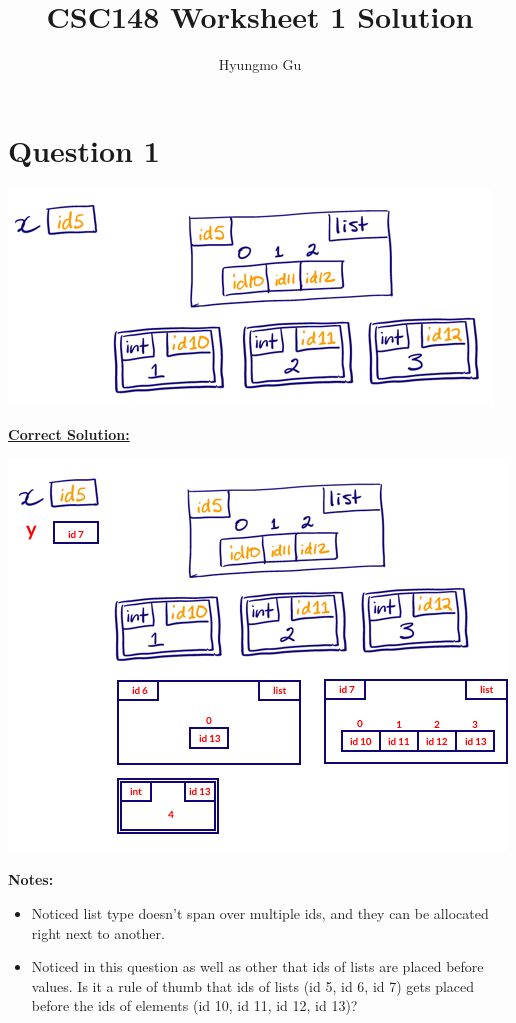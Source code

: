 \documentclass[12pt]{article}
\begin{document}
\title{CSC148 Worksheet 1 Solution}
\author{Hyungmo Gu}
\maketitle

\section*{Question 1}
\begin{center}
\includegraphics[width=0.5\linewidth]{images/worksheet_1_q1_solution.png}
\end{center}

\bigskip

\begin{mdframed}
    \underline{\textbf{Correct Solution:}}

    \bigskip

    \begin{center}
    \includegraphics[width=0.75\linewidth]{images/worksheet_1_q1_correction.png}
    \end{center}

\end{mdframed}

\bigskip

\textbf{Notes:}

\begin{itemize}
    \item Noticed list type doesn't span over multiple ids, and they can be allocated
    right next to another.
    \item Noticed in this question as well as other that ids of lists are placed before values.
    Is it a rule of thumb that ids of lists (id 5, id 6, id 7) gets placed before the ids of
    elements (id 10, id 11, id 12, id 13)?
\end{itemize}
\end{document}
